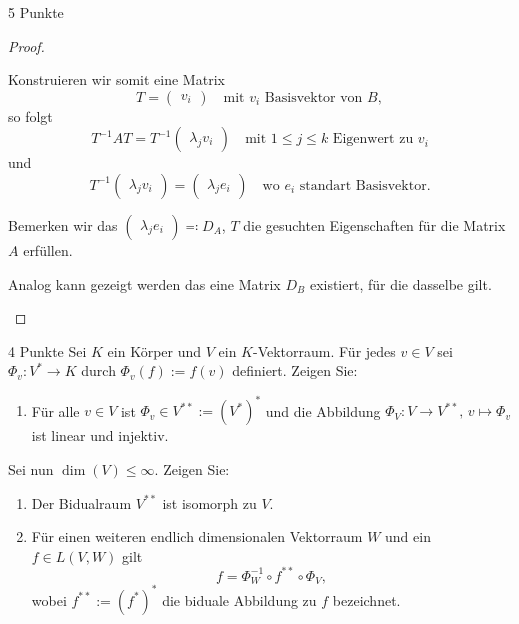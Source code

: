 \documentclass{problemset}
\begin{document}
\begin{problem}{5 Punkte}
\begin{proof}
\begin{enumerate}
              Konstruieren wir somit eine Matrix
              \begin{equation*}
                  T = \begin{pmatrix}
                      v_i
                  \end{pmatrix} \quad \text{mit } v_i \text{ Basisvektor von } B,
              \end{equation*} so folgt
              \begin{equation*}
                  T^{-1}AT = T^{-1} \begin{pmatrix}
                      \lambda_j v_i
                  \end{pmatrix} \quad \text{mit } 1 \le j \le k \text{ Eigenwert zu } v_i
              \end{equation*} und
              \begin{equation*}
                  T^{-1} \begin{pmatrix}
                      \lambda_j v_i
                  \end{pmatrix} = \begin{pmatrix}
                      \lambda_j e_i
                  \end{pmatrix} \quad \text{wo } e_i \text{ standart Basisvektor}.
              \end{equation*}

              Bemerken wir das \( \begin{pmatrix} \lambda_j e_i \end{pmatrix} \eqcolon D_A
              \), \(T\) die gesuchten Eigenschaften für die Matrix \(A\) erfüllen.

              Analog kann gezeigt werden das eine Matrix \(D_B\) existiert, für die dasselbe
              gilt.
    \end{enumerate}

\end{proof}
\end{problem}

\begin{problem}[Bidualraum]{4 Punkte}
Sei $K$ ein Körper und $V$ ein $K$-Vektorraum. Für jedes $v \in V$ sei $\Phi_v : V^* \to K$ durch $\Phi_v(f) := f(v)$ definiert. Zeigen Sie:
\begin{enumerate}
    \item Für alle $v \in V$ ist $\Phi_v \in V^{**} := (V^*)^*$ und die Abbildung $\Phi_V
              : V \to V^{**}, \, v \mapsto \Phi_v$ ist linear und injektiv.
\end{enumerate}
Sei nun $\dim(V) \leq \infty$. Zeigen Sie:
\begin{enumerate}[resume]
    \item Der Bidualraum $V^{**}$ ist isomorph zu $V$.
    \item Für einen weiteren endlich dimensionalen Vektorraum $W$ und ein $f \in L(V, W)$
          gilt
          \[
              f = \Phi_W^{-1} \circ f^{**} \circ \Phi_V,
          \]
          wobei $f^{**} := (f^*)^*$ die biduale Abbildung zu $f$ bezeichnet.
\end{enumerate}
\end{problem}
\end{document}
